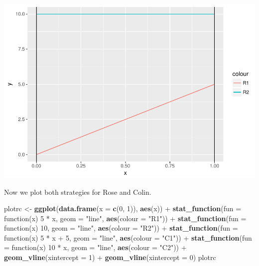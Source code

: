 \documentclass[]{article}
\newenvironment{Shaded}{\begin{snugshade}}{\end{snugshade}}
\newcommand{\KeywordTok}[1]{\textcolor[rgb]{0.13,0.29,0.53}{\textbf{{#1}}}}
\newcommand{\DataTypeTok}[1]{\textcolor[rgb]{0.13,0.29,0.53}{{#1}}}
\newcommand{\DecValTok}[1]{\textcolor[rgb]{0.00,0.00,0.81}{{#1}}}
\newcommand{\StringTok}[1]{\textcolor[rgb]{0.31,0.60,0.02}{{#1}}}
\newcommand{\NormalTok}[1]{{#1}}
\begin{document}
\includegraphics{Christophe_Hunt_hw9_files/figure-latex/unnamed-chunk-4-1.pdf}

Now we plot both strategies for Rose and Colin.

\begin{Shaded}
\begin{Highlighting}[]
\NormalTok{plotrc <-}\StringTok{ }\KeywordTok{ggplot}\NormalTok{(}\KeywordTok{data.frame}\NormalTok{(}\DataTypeTok{x =} \KeywordTok{c}\NormalTok{(}\DecValTok{0}\NormalTok{, }\DecValTok{1}\NormalTok{)), }\KeywordTok{aes}\NormalTok{(x)) +}\StringTok{ }\KeywordTok{stat_function}\NormalTok{(}\DataTypeTok{fun =} \NormalTok{function(x) }\DecValTok{5} \NormalTok{*}\StringTok{ }
\StringTok{    }\NormalTok{x, }\DataTypeTok{geom =} \StringTok{"line"}\NormalTok{, }\KeywordTok{aes}\NormalTok{(}\DataTypeTok{colour =} \StringTok{"R1"}\NormalTok{)) +}\StringTok{ }\KeywordTok{stat_function}\NormalTok{(}\DataTypeTok{fun =} \NormalTok{function(x) }\DecValTok{10}\NormalTok{, }
    \DataTypeTok{geom =} \StringTok{"line"}\NormalTok{, }\KeywordTok{aes}\NormalTok{(}\DataTypeTok{colour =} \StringTok{"R2"}\NormalTok{)) +}\StringTok{ }\KeywordTok{stat_function}\NormalTok{(}\DataTypeTok{fun =} \NormalTok{function(x) }\DecValTok{5} \NormalTok{*}\StringTok{ }
\StringTok{    }\NormalTok{x +}\StringTok{ }\DecValTok{5}\NormalTok{, }\DataTypeTok{geom =} \StringTok{"line"}\NormalTok{, }\KeywordTok{aes}\NormalTok{(}\DataTypeTok{colour =} \StringTok{"C1"}\NormalTok{)) +}\StringTok{ }\KeywordTok{stat_function}\NormalTok{(}\DataTypeTok{fun =} \NormalTok{function(x) }\DecValTok{10} \NormalTok{*}\StringTok{ }
\StringTok{    }\NormalTok{x, }\DataTypeTok{geom =} \StringTok{"line"}\NormalTok{, }\KeywordTok{aes}\NormalTok{(}\DataTypeTok{colour =} \StringTok{"C2"}\NormalTok{)) +}\StringTok{ }\KeywordTok{geom_vline}\NormalTok{(}\DataTypeTok{xintercept =} \DecValTok{1}\NormalTok{) +}\StringTok{ }\KeywordTok{geom_vline}\NormalTok{(}\DataTypeTok{xintercept =} \DecValTok{0}\NormalTok{)}
\NormalTok{plotrc}
\end{Highlighting}
\end{Shaded}
\end{document}
